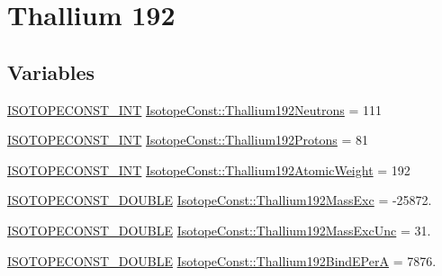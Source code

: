 \hypertarget{group___isotope_const-_thallium-_tl192}{}\section{Thallium 192}
\label{group___isotope_const-_thallium-_tl192}
\subsection*{Variables}
\begin{DoxyCompactItemize}
\item 
\mbox{\hyperlink{group___isotope_const-_macros_ga5f18360b3e99483a35c32d789e62621c}{I\+S\+O\+T\+O\+P\+E\+C\+O\+N\+S\+T\+\_\+\+I\+NT}} \mbox{\hyperlink{group___isotope_const-_thallium-_tl192_ga536673082f8c0e47069b079d8fa1af32}{Isotope\+Const\+::\+Thallium192\+Neutrons}} = 111
\item 
\mbox{\hyperlink{group___isotope_const-_macros_ga5f18360b3e99483a35c32d789e62621c}{I\+S\+O\+T\+O\+P\+E\+C\+O\+N\+S\+T\+\_\+\+I\+NT}} \mbox{\hyperlink{group___isotope_const-_thallium-_tl192_gac7001d1549bc49affd17fac6680f4f4a}{Isotope\+Const\+::\+Thallium192\+Protons}} = 81
\item 
\mbox{\hyperlink{group___isotope_const-_macros_ga5f18360b3e99483a35c32d789e62621c}{I\+S\+O\+T\+O\+P\+E\+C\+O\+N\+S\+T\+\_\+\+I\+NT}} \mbox{\hyperlink{group___isotope_const-_thallium-_tl192_ga2befeb5b873a54bad5f0e8648dbe4e79}{Isotope\+Const\+::\+Thallium192\+Atomic\+Weight}} = 192
\item 
\mbox{\hyperlink{group___isotope_const-_macros_ga8f45a7272ce02c0b4c65c44636ed719a}{I\+S\+O\+T\+O\+P\+E\+C\+O\+N\+S\+T\+\_\+\+D\+O\+U\+B\+LE}} \mbox{\hyperlink{group___isotope_const-_thallium-_tl192_ga18d1367218447ec6738cbbc82fc80db6}{Isotope\+Const\+::\+Thallium192\+Mass\+Exc}} = -\/25872.
\item 
\mbox{\hyperlink{group___isotope_const-_macros_ga8f45a7272ce02c0b4c65c44636ed719a}{I\+S\+O\+T\+O\+P\+E\+C\+O\+N\+S\+T\+\_\+\+D\+O\+U\+B\+LE}} \mbox{\hyperlink{group___isotope_const-_thallium-_tl192_gaeaceb0668f72bd97828841fdc299e0e1}{Isotope\+Const\+::\+Thallium192\+Mass\+Exc\+Unc}} = 31.
\item 
\mbox{\hyperlink{group___isotope_const-_macros_ga8f45a7272ce02c0b4c65c44636ed719a}{I\+S\+O\+T\+O\+P\+E\+C\+O\+N\+S\+T\+\_\+\+D\+O\+U\+B\+LE}} \mbox{\hyperlink{group___isotope_const-_thallium-_tl192_ga395d1aba2f390ec57912227a93694e13}{Isotope\+Const\+::\+Thallium192\+Bind\+E\+PerA}} = 7876.
\item 

\end{DoxyCompactItemize}
